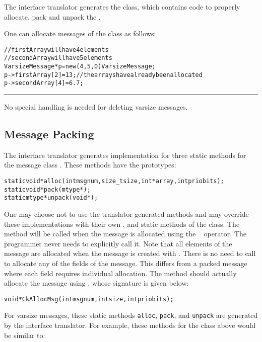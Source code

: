 {The interface translator generates the  class,
which contains code to properly allocate, pack and unpack the
.


One can allocate messages of the  class as follows:

\begin{alltt}
// firstArray will have 4 elements
// secondArray will have 5 elements 
VarsizeMessage* p = new(4, 5, 0) VarsizeMessage;
p->firstArray[2] = 13;     // the arrays have already been allocated 
p->secondArray[4] = 6.7; 
\end{alltt}

\hrule
\normalsize
No special handling is needed for deleting varsize messages.
} %

\subsection{Message Packing}

\label{message packing}

The \charmpp{} interface translator generates implementation for three static
methods for the message class . These methods have the
prototypes:

\begin{alltt}
    static void* alloc(int msgnum, size_t size, int* array, int priobits);
    static void* pack(mtype*);
    static mtype* unpack(void*);
\end{alltt}

One may choose not to use the translator-generated methods and may override
these implementations with their own ,  and 
static methods of the  class.  The  method will be called
when the message is allocated using the \CC\  operator. The programmer
never needs to explicitly call it.  Note that all elements of the message are
allocated when the message is created with . There is no need to call
 to allocate any of the fields of the message. This differs from a
packed message where each field requires individual allocation. The 
method should actually allocate the message using , whose
signature is given below:

\begin{alltt}
void *CkAllocMsg(int msgnum, int size, int priobits); 
\end{alltt}  


For varsize messages, these static methods \texttt{alloc}, \texttt{pack}, and 
\texttt{unpack} are
generated by the interface translator.  For example, these
methods for the  class above would be similar to:

